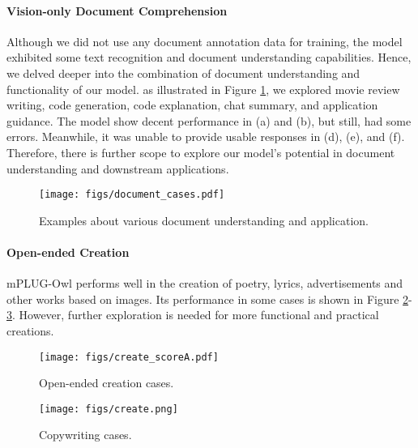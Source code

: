 \documentclass{article}
\begin{document}
\paragraph{Vision-only Document Comprehension}
Although we did not use any document annotation data for training, the model exhibited some text recognition and document understanding capabilities. Hence, we delved deeper into the combination of document understanding and functionality of our model. as illustrated in Figure \ref{fig:document_app}, we explored movie review writing, code generation, code explanation, chat summary, and application guidance. The model show decent performance in (a) and (b), but still, had some errors. Meanwhile, it was unable to provide usable responses in (d), (e), and (f). Therefore, there is further scope to explore our model's potential in document understanding and downstream applications.
\begin{figure}[!ht]
    \centering
    \texttt{[image: figs/document\_cases.pdf]}
    \caption{Examples about various document understanding and application.}
    \label{fig:document_app}
    \vspace{-2mm}
\end{figure}

\paragraph{Open-ended Creation}
mPLUG-Owl performs well in the creation of poetry, lyrics, advertisements and other works based on images. Its performance in some cases is shown in Figure \ref{fig:create_scoreA}-\ref{fig:copywriting}. However, further exploration is needed for more functional and practical creations.
\begin{figure}[!ht]
    \centering
    \texttt{[image: figs/create\_scoreA.pdf]}
    \caption{Open-ended creation cases.}
    \label{fig:create_scoreA}
    \vspace{-2mm}
\end{figure}

\begin{figure}[!ht]
    \centering
    \texttt{[image: figs/create.png]}
    \caption{Copywriting cases.}
    \label{fig:copywriting}
    \vspace{-2mm}
\end{figure}
\end{document}
